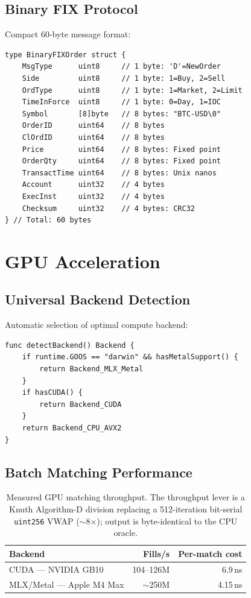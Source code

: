 \documentclass[11pt,a4paper]{article}
\begin{document}
\subsection{Binary FIX Protocol}

Compact 60-byte message format:

\begin{lstlisting}
type BinaryFIXOrder struct {
    MsgType      uint8     // 1 byte: 'D'=NewOrder
    Side         uint8     // 1 byte: 1=Buy, 2=Sell
    OrdType      uint8     // 1 byte: 1=Market, 2=Limit
    TimeInForce  uint8     // 1 byte: 0=Day, 1=IOC
    Symbol       [8]byte   // 8 bytes: "BTC-USD\0"
    OrderID      uint64    // 8 bytes
    ClOrdID      uint64    // 8 bytes
    Price        uint64    // 8 bytes: Fixed point
    OrderQty     uint64    // 8 bytes: Fixed point
    TransactTime uint64    // 8 bytes: Unix nanos
    Account      uint32    // 4 bytes
    ExecInst     uint32    // 4 bytes
    Checksum     uint32    // 4 bytes: CRC32
} // Total: 60 bytes
\end{lstlisting}

\section{GPU Acceleration}
\label{sec:gpu}

\subsection{Universal Backend Detection}

Automatic selection of optimal compute backend:

\begin{lstlisting}
func detectBackend() Backend {
    if runtime.GOOS == "darwin" && hasMetalSupport() {
        return Backend_MLX_Metal
    }
    if hasCUDA() {
        return Backend_CUDA
    }
    return Backend_CPU_AVX2
}
\end{lstlisting}

\subsection{Batch Matching Performance}

\begin{table}[H]
\centering
\begin{tabular}{lrr}
\toprule
\textbf{Backend} & \textbf{Fills/s} & \textbf{Per-match cost} \\
\midrule
CUDA --- NVIDIA GB10 & 104--126M & 6.9\,ns \\
MLX/Metal --- Apple M4 Max & $\sim$250M & 4.15\,ns \\
\bottomrule
\end{tabular}
\caption{Measured GPU matching throughput. The throughput lever is a Knuth
Algorithm-D division replacing a 512-iteration bit-serial \texttt{uint256}
VWAP ($\sim$8$\times$); output is byte-identical to the CPU oracle.}
\end{table}
\end{document}
